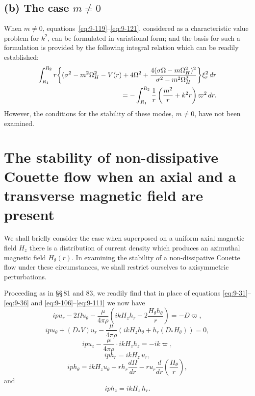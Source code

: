 \subsection*{(b) The case $m \ne 0$}

When $m \ne 0$, equations~\eqref{eq:9-119}--\eqref{eq:9-121}, considered as a characteristic value problem for $k^2$, can be formulated in variational form; and the basis for such a formulation is provided by the following integral relation which can be readily established:
\begin{align}
\int_{R_1}^{R_2} r\!\left\{(\sigma^2 - m^2\Omega_H^2 - V(r) + 4\Omega^2 + \frac{4(\sigma\Omega - m\Omega_H^2)^2}{\sigma^2 - m^2\Omega_H^2}\right\}\!\xi_r^2\, dr \notag \\
= -\int_{R_1}^{R_2} \frac{1}{r}\left(\frac{m^2}{r} + k^2 r\right)\varpi^2\, dr. \label{eq:9-127}
\end{align}
However, the conditions for the stability of these modes, $m \ne 0$, have not been examined.

\section{The stability of non-dissipative Couette flow when an axial and a transverse magnetic field are present}
\label{sec:84}

We shall briefly consider the case when superposed on a uniform axial magnetic field $H_z$ there is a distribution of current density which produces an azimuthal magnetic field $H_\theta(r)$. In examining the stability of a non-dissipative Couette flow under these circumstances, we shall restrict ourselves to axisymmetric perturbations.

Proceeding as in \S\S\,81 and 83, we readily find that in place of equations \eqref{eq:9-31}--\eqref{eq:9-36} and \eqref{eq:9-106}--\eqref{eq:9-111} we now have
\begin{equation}
ip u_r - 2\Omega u_\theta - \frac{\mu}{4\pi\rho}\left(ikH_z h_r - 2\frac{H_\theta h_\theta}{r}\right) = -D\varpi, \label{eq:9-128}
\end{equation}
\begin{equation}
ip u_\theta + (D_*V) u_r - \frac{\mu}{4\pi\rho}(ikH_z h_\theta + h_r(D_*H_\theta)) = 0, \label{eq:9-129}
\end{equation}
\begin{equation}
ip u_z - \frac{\mu}{4\pi\rho}\cdot ikH_z h_z = -ik\varpi, \label{eq:9-130}
\end{equation}
\begin{equation}
iph_r = ikH_z\, u_r, \label{eq:9-131}
\end{equation}
\begin{equation}
iph_\theta = ikH_z u_\theta + rh_r\frac{d\Omega}{dr} - ru_r\frac{d}{dr}\!\left(\frac{H_\theta}{r}\right), \label{eq:9-132}
\end{equation}
and
\begin{equation}
iph_z = ikH_z\, h_r. \label{eq:9-133}
\end{equation}

